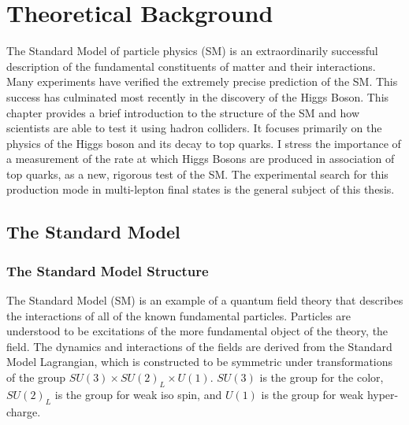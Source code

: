 \chapter[Theoretical Background][Theoretical Background]{Theoretical Background}
\label{chapter:theory}
The Standard Model of particle physics (SM) is an extraordinarily successful
description of the fundamental constituents of matter and their interactions.
Many experiments have verified the extremely precise
prediction of the SM. This success has culminated most recently in the
discovery of the Higgs Boson.  This chapter provides a brief introduction to
the structure of the SM and how scientists are able to test it using hadron
colliders. It focuses primarily on the physics of the Higgs boson and its decay
to top quarks.  I stress the importance of a
measurement of the rate at which Higgs Bosons are produced in association of
top quarks, as a new, rigorous test of the SM. The experimental search
for this production mode in multi-lepton final states is the 
general subject of this thesis.


\section{The Standard Model}
\subsection{The Standard Model Structure}

The Standard Model (SM) \cite{np_22_579, prl_19_1264, 1964.Salam-Ward.gauge-theory,1973.Weinberg.SM-with-QCD} is an example of a quantum field theory that describes
the interactions of all of the known fundamental particles. Particles are understood to be excitations of the more fundamental
object of the theory, the field. The dynamics and interactions of the fields are
derived from the Standard Model Lagrangian, which is constructed to be
symmetric under transformations of the group $SU(3) \times SU(2)_L
  \times U(1)$. $SU(3)$ is the group for the color, $SU(2)_L$ is the group 
for weak iso spin, and $U(1)$ is the group for weak hyper-charge.

